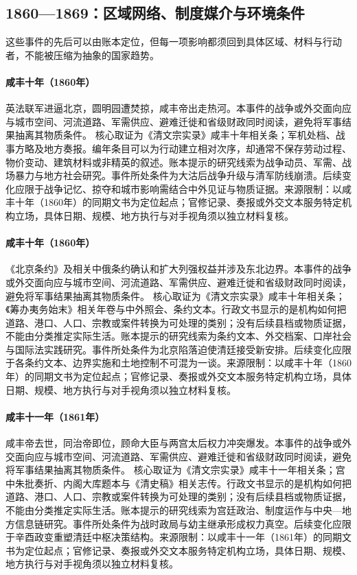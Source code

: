 \subsection{1860—1869：区域网络、制度媒介与环境条件}
这些事件的先后可以由账本定位，但每一项影响都须回到具体区域、材料与行动者，不能被压缩为抽象的国家趋势。
\hypertarget{civic:EQ-1860-BEIJING-CAMPAIGN}{}\paragraph{咸丰十年（1860年）}英法联军进逼北京，圆明园遭焚掠，咸丰帝出走热河。本事件的战争或外交面向应与城市空间、河流道路、军需供应、避难迁徙和省级财政同时阅读，避免将军事结果抽离其物质条件。 核心取证为《清文宗实录》咸丰十年相关条；军机处档、战事方略及地方奏报。编年条目可以为行动建立相对次序，却通常不保存劳动过程、物价变动、建筑材料或非精英的叙述。账本提示的研究线索为战争动员、军需、战场暴力与地方社会研究。事件所处条件为大沽后战争升级与清军防线崩溃。后续变化应限于战争记忆、掠夺和城市影响需结合中外见证与物质证据。来源限制：以咸丰十年（1860年）的同期文书为定位起点；官修记录、奏报或外交文本服务特定机构立场，具体日期、规模、地方执行与对手视角须以独立材料复核。
\hypertarget{civic:EQ-1860-CONVENTION-OF-PEKING}{}\paragraph{咸丰十年（1860年）}《北京条约》及相关中俄条约确认和扩大列强权益并涉及东北边界。本事件的战争或外交面向应与城市空间、河流道路、军需供应、避难迁徙和省级财政同时阅读，避免将军事结果抽离其物质条件。 核心取证为《清文宗实录》咸丰十年相关条；《筹办夷务始末》相关年卷与中外照会、条约文本。行政文书显示的是机构如何把道路、港口、人口、宗教或案件转换为可处理的类别；没有后续县档或物质证据，不能由分类推定实际生活。账本提示的研究线索为条约文本、外交档案、口岸社会与国际法实践研究。事件所处条件为北京陷落迫使清廷接受新安排。后续变化应限于各条约文本、边界实施和土地控制不可混为一谈。来源限制：以咸丰十年（1860年）的同期文书为定位起点；官修记录、奏报或外交文本服务特定机构立场，具体日期、规模、地方执行与对手视角须以独立材料复核。
\hypertarget{civic:EQ-1861-XIANFENG-DEATH}{}\paragraph{咸丰十一年（1861年）}咸丰帝去世，同治帝即位，顾命大臣与两宫太后权力冲突爆发。本事件的战争或外交面向应与城市空间、河流道路、军需供应、避难迁徙和省级财政同时阅读，避免将军事结果抽离其物质条件。 核心取证为《清文宗实录》咸丰十一年相关条；宫中朱批奏折、内阁大库题本与《清史稿》相关志传。行政文书显示的是机构如何把道路、港口、人口、宗教或案件转换为可处理的类别；没有后续县档或物质证据，不能由分类推定实际生活。账本提示的研究线索为宫廷政治、制度运作与中央—地方信息链研究。事件所处条件为战时政局与幼主继承形成权力真空。后续变化应限于辛酉政变重塑清廷中枢决策结构。来源限制：以咸丰十一年（1861年）的同期文书为定位起点；官修记录、奏报或外交文本服务特定机构立场，具体日期、规模、地方执行与对手视角须以独立材料复核。
